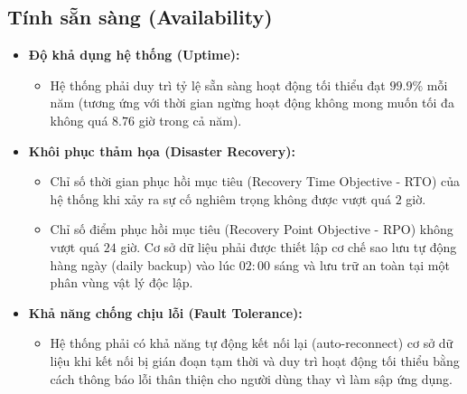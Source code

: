 \subsection{Tính sẵn sàng (Availability)}
\label{subsec:nfr_availability}
\begin{itemize}
    \item \textbf{Độ khả dụng hệ thống (Uptime):}
    \begin{itemize}
        \item Hệ thống phải duy trì tỷ lệ sẵn sàng hoạt động tối thiểu đạt $99.9\%$ mỗi năm (tương ứng với thời gian ngừng hoạt động không mong muốn tối đa không quá $8.76$ giờ trong cả năm).
    \end{itemize}
    \item \textbf{Khôi phục thảm họa (Disaster Recovery):}
    \begin{itemize}
        \item Chỉ số thời gian phục hồi mục tiêu (Recovery Time Objective - RTO) của hệ thống khi xảy ra sự cố nghiêm trọng không được vượt quá $2$ giờ.
        \item Chỉ số điểm phục hồi mục tiêu (Recovery Point Objective - RPO) không vượt quá $24$ giờ. Cơ sở dữ liệu phải được thiết lập cơ chế sao lưu tự động hàng ngày (daily backup) vào lúc $02:00$ sáng và lưu trữ an toàn tại một phân vùng vật lý độc lập.
    \end{itemize}
    \item \textbf{Khả năng chống chịu lỗi (Fault Tolerance):}
    \begin{itemize}
        \item Hệ thống phải có khả năng tự động kết nối lại (auto-reconnect) cơ sở dữ liệu khi kết nối bị gián đoạn tạm thời và duy trì hoạt động tối thiểu bằng cách thông báo lỗi thân thiện cho người dùng thay vì làm sập ứng dụng.
    \end{itemize}
\end{itemize}

